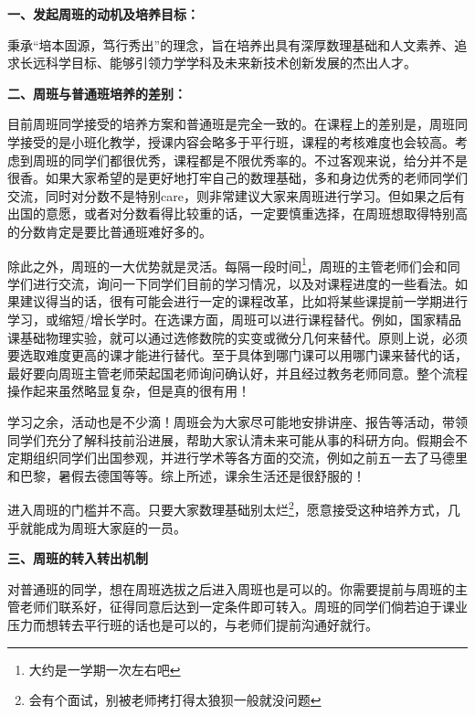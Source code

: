 \textbf{\textbf{一、发起周班的动机及培养目标：}}

秉承“培本固源，笃行秀出”的理念，旨在培养出具有深厚数理基础和人文素养、追求长远科学目标、能够引领力学学科及未来新技术创新发展的杰出人才。

\vspace{10pt}

\textbf{\textbf{二、周班与普通班培养的差别：}}

目前周班同学接受的培养方案和普通班是完全一致的。在课程上的差别是，周班同学接受的是小班化教学，授课内容会略多于平行班，课程的考核难度也会较高。考虑到周班的同学们都很优秀，课程都是不限优秀率的。不过客观来说，给分并不是很香。如果大家希望的是更好地打牢自己的数理基础，多和身边优秀的老师同学们交流，同时对分数不是特别care，则非常建议大家来周班进行学习。但如果之后有出国的意愿，或者对分数看得比较重的话，一定要慎重选择，在周班想取得特别高的分数肯定是要比普通班难好多的。

\vspace{10pt}

除此之外，周班的一大优势就是灵活。每隔一段时间\footnote{大约是一学期一次左右吧}，周班的主管老师们会和同学们进行交流，询问一下同学们目前的学习情况，以及对课程进度的一些看法。如果建议得当的话，很有可能会进行一定的课程改革，比如将某些课提前一学期进行学习，或缩短/增长学时。在选课方面，周班可以进行课程替代。例如，国家精品课基础物理实验，就可以通过选修数院的实变或微分几何来替代。原则上说，必须要选取难度更高的课才能进行替代。至于具体到哪门课可以用哪门课来替代的话，最好要向周班主管老师荣起国老师询问确认好，并且经过教务老师同意。整个流程操作起来虽然略显复杂，但是真的很有用！

\vspace{10pt}

学习之余，活动也是不少滴！周班会为大家尽可能地安排讲座、报告等活动，带领同学们充分了解科技前沿进展，帮助大家认清未来可能从事的科研方向。假期会不定期组织同学们出国参观，并进行学术等各方面的交流，例如之前五一去了马德里和巴黎，暑假去德国等等。综上所述，课余生活还是很舒服的！

\vspace{10pt}

进入周班的门槛并不高。只要大家数理基础别太烂\footnote{会有个面试，别被老师拷打得太狼狈一般就没问题}，愿意接受这种培养方式，几乎就能成为周班大家庭的一员。

\vspace{10pt}

\textbf{\textbf{三、周班的转入转出机制}}

对普通班的同学，想在周班选拔之后进入周班也是可以的。你需要提前与周班的主管老师们联系好，征得同意后达到一定条件即可转入。周班的同学们倘若迫于课业压力而想转去平行班的话也是可以的，与老师们提前沟通好就行。

